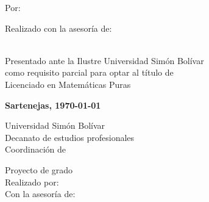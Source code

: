 \documentclass
[
  12pt,
  letterpaper,
  openany,
  oneside,
]{book}
\begin{document}
    \vspace{1.5cm}

    Por:
    \\
    \autor

    \vspace{1.5cm}

    Realizado con la asesoría de:
    \\
    \tutor

    \vspace{3cm}

    \\
    Presentado ante la Ilustre Universidad Simón Bolívar\\
    como requisito parcial para optar al título de\\
    Licenciado en Matemáticas Puras

    \vspace{\fill}

    \textbf{Sartenejas, \today}\par
\egroup
\fi


\ifresumen\newpage
\pagestyle{plain}
\setcounter{page}{4}
%
\PrintUsbLogo
    {
        Universidad Simón Bolívar\\
        Decanato de estudios profesionales\\
        Coordinación de \coord
    }

\begin{center}
    \begin{minipage}{14cm}
        \centering
        \UppercaseBold
            {
                \MainTitle
            }
    \end{minipage}

    \vspace{.5cm}

    \UpperCase
        {
            Proyecto de grado
        } \\
    Realizado por: \autor \\
    Con la asesoría de: \tutor \\[.5cm]

\end{center}
\end{document}
